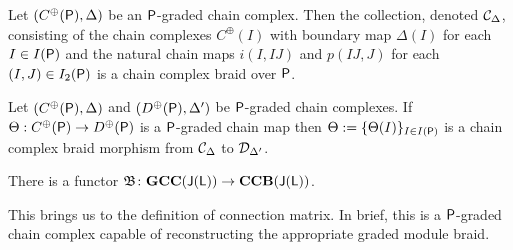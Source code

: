 \begin{prop}\label{prop:fran:3.4}
Let $(C^\oplus({\mathsf P}),\Delta)$ be an ${\mathsf P}$-graded chain complex.  Then the collection, denoted ${\mathcal C}_\Delta$, consisting of the chain complexes $C^\oplus(I)$ with boundary map $\Delta(I)$ for each $I\in I({\mathsf P})$ and the natural chain maps $i(I,IJ)$ and $p(IJ,J)$ for each $(I,J)\in I_2({\mathsf P})$ is a chain complex braid over ${\mathsf P}$. 
\end{prop}

\begin{prop}\label{prop:UTMap}
Let $(C^\oplus({\mathsf P}),\Delta)$ and $(D^\oplus({\mathsf P}),\Delta')$ be ${\mathsf P}$-graded chain complexes.  If $\Theta:C^\oplus({\mathsf P})\to D^\oplus({\mathsf P})$ is a ${\mathsf P}$-graded chain map then $\Theta:=\{\Theta(I)\}_{I\in I({\mathsf P})}$ is a chain complex braid morphism from ${\mathcal C}_\Delta$ to  $\mathcal{D}_{\Delta'}$.
\end{prop}








\begin{cor}
There is a functor $\mathfrak{B}\colon {\bf GCC}({\mathsf J}({\mathsf L}))\to {\bf CCB}({\mathsf J}({\mathsf L}))$.
\end{cor}

This brings us to the definition of connection matrix.  In brief, this is a ${\mathsf P}$-graded chain complex capable of reconstructing the appropriate graded module braid.

